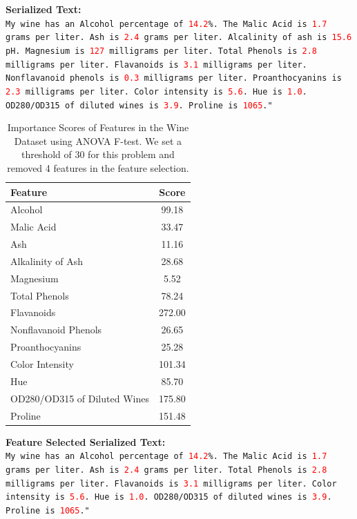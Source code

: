 \documentclass{article}
\theoremstyle{plain}
\theoremstyle{definition}
\theoremstyle{remark}
\begin{document}
\begin{mdframed}
\textbf{Serialized Text:}\\
\texttt{My wine has an Alcohol percentage of \textcolor{red}{14.2}\%. The Malic Acid is \textcolor{red}{1.7} grams per liter. Ash is \textcolor{red}{2.4}  grams per liter. Alcalinity of ash is \textcolor{red}{15.6} pH. Magnesium is \textcolor{red}{127} milligrams per liter. Total Phenols is \textcolor{red}{2.8}  milligrams per liter. Flavanoids is \textcolor{red}{3.1} milligrams per liter. Nonflavanoid phenols is \textcolor{red}{0.3} milligrams per liter. Proanthocyanins is \textcolor{red}{2.3} milligrams per liter. Color intensity is \textcolor{red}{5.6}. Hue is \textcolor{red}{1.0}. OD280/OD315 of diluted wines is \textcolor{red}{3.9}. Proline is \textcolor{red}{1065}."  
}
\end{mdframed}

\begin{table}[h!]
\centering
\begin{tabular}{lc}
\toprule
\textbf{Feature} & \textbf{Score} \\
\midrule
Alcohol & 99.18 \\
Malic Acid & 33.47 \\
Ash & 11.16 \\
Alkalinity of Ash & 28.68 \\
Magnesium & 5.52 \\
Total Phenols & 78.24 \\
Flavanoids & 272.00 \\
Nonflavanoid Phenols & 26.65 \\
Proanthocyanins & 25.28 \\
Color Intensity & 101.34 \\
Hue & 85.70 \\
OD280/OD315 of Diluted Wines & 175.80 \\
Proline & 151.48 \\
\bottomrule
\end{tabular}
\caption{Importance Scores of Features in the Wine Dataset using ANOVA F-test. We set a threshold of 30 for this problem and removed 4 features in the feature selection.}
\label{tab:feature_scores}
\end{table}


\begin{mdframed}
\newpage
\textbf{Feature Selected Serialized Text:}\\
\texttt{My wine has an Alcohol percentage of \textcolor{red}{14.2}\%. The Malic Acid is \textcolor{red}{1.7} grams per liter. Ash is \textcolor{red}{2.4}  grams per liter. Total Phenols is \textcolor{red}{2.8}  milligrams per liter. Flavanoids is \textcolor{red}{3.1} milligrams per liter. Color intensity is \textcolor{red}{5.6}. Hue is \textcolor{red}{1.0}. OD280/OD315 of diluted wines is \textcolor{red}{3.9}. Proline is \textcolor{red}{1065}."  
}
\end{mdframed}
\end{document}
